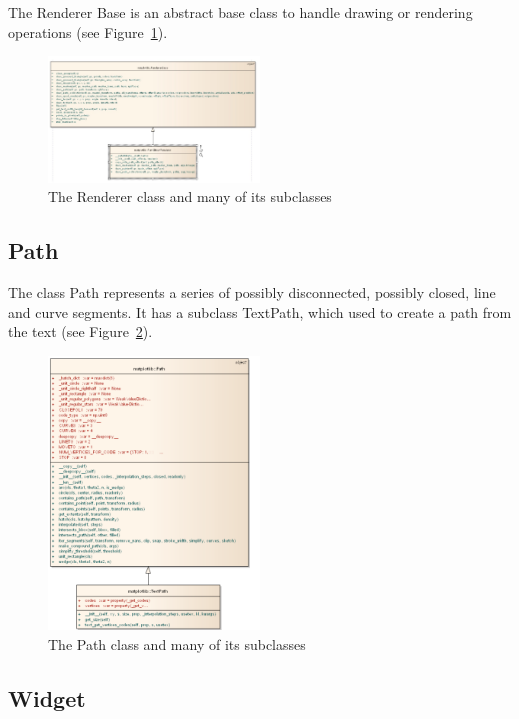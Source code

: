 \documentclass[pdftex,10pt,a4paper]{report}
\begin{document}
The Renderer Base is an abstract base class to handle drawing or rendering operations (see Figure~\ref{fig:render}).


\begin{figure}[ht!]
        \centering
                \includegraphics[width=0.5\textwidth]{img/umls/candy/Renderer}
        \caption{The Renderer class and many of its subclasses}\label{fig:render}
\end{figure}

\subsection{Path}

The class Path represents a series of possibly disconnected, possibly closed, line and curve segments. It has a subclass TextPath, which used to create a path from the text (see Figure~\ref{fig:path}).


\begin{figure}[ht!]
        \centering
                \includegraphics[width=0.5\textwidth]{img/umls/candy/Path}
        \caption{The Path class and many of its subclasses}\label{fig:path}
\end{figure}

\subsection{Widget}
\end{document}
